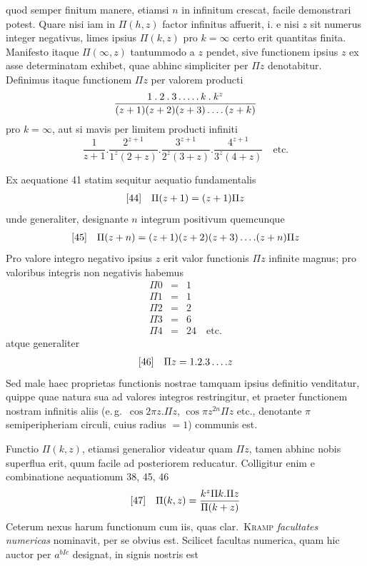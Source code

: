 quod semper finitum manere, etiamsi $n$ in infinitum crescat, facile demonstrari
potest. Quare nisi iam in $\Pi(h,z)$ factor infinitus affuerit, i. e nisi $z$ sit numerus integer negativus, limes ipsius $\Pi(k,z)$ pro $k=\infty$ certo erit quantitas finita. Manifesto itaque $\Pi(\infty,z)$ tantummodo a $z$ pendet, sive functionem ipsius
$z$ ex asse determinatam exhibet, quae abhinc simpliciter per $\Pi z$ denotabitur.
Definimus itaque functionem $\Pi z$ per valorem producti
\[
\frac{1\mathbin{.}2\mathbin{.}3\mathinner{.\,.\,.\,.\,.}k\mathbin{.}k^z}{(z+1)(z+2)(z+3)\mathinner{.\,.\,.\,.}(z+k)}
\]
pro $k=\infty$, aut si mavis per limitem producti infiniti
\[
\frac{1}{z+1}.\frac{2^{z+1}}{1^z(2+z)}.
\frac{3^{z+1}}{2^z(3+z)}.\frac{4^{z+1}}{3^z(4+z)}\quad\mathrm{etc.}
\]

Ex aequatione 41 statim sequitur aequatio fundamentalis
\[
\begin{array}{@{}ll@{}}
[44]&\displaystyle\Pi(z+1)=(z+1)\Pi z
\end{array}
\]
unde generaliter, designante $n$ integrum positivum quemcunque
\[
\begin{array}{@{}ll@{}}
[45]&\displaystyle\Pi(z+n)=(z+1)(z+2)(z+3)\,.\,.\,.\,.(z+n)\Pi z
\end{array}
\]
Pro valore integro negativo ipsius $z$ erit valor functionis $\Pi z$
infinite magnus; pro valoribus integris non negativis habemus
\[
\begin{array}{rcl}
\Pi0&=&1\\
\Pi1&=&1\\
\Pi2&=&2\\
\Pi3&=&6\\
\Pi4&=&24\quad\mathrm{etc.}
\end{array}
\]
atque generaliter
\[
\begin{array}{@{}ll@{}}
[46]&\displaystyle\Pi z=1.2.3\,.\,.\,.\,.z
\end{array}
\]
Sed male haec proprietas functionis nostrae tamquam ipsius definitio
venditatur, quippe quae natura sua ad valores integros restringitur,
et praeter functionem nostram infinitis aliis
(e.\,g.\ $\cos2\pi z.\Pi z$, $\cos\pi z^{2n}\Pi z$ etc., denotante $\pi$
semiperipheriam circuli, cuius radius $=1$) communis est.

Functio $\Pi(k,z)$, etiamsi generalior videatur quam $\Pi z$, tamen
abhinc nobis superflua erit, quum facile ad posteriorem reducatur.
Colligitur enim e combinatione aequationum 38, 45, 46
\[
\begin{array}{@{}ll@{}}
[47]&\displaystyle\Pi(k,z)=\frac{k^z\Pi k.\Pi z}{\Pi(k+z)}
\end{array}
\]
Ceterum nexus harum functionum cum iis, quas clar.\ \textsc{Kramp}
\emph{facultates numericas} nominavit, per se obvius est.
Scilicet facultas numerica, quam hic auctor per
$a^{bIc}$
designat, in signis nostris est


